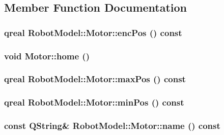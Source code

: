 \subsection{Member Function Documentation}
\hypertarget{class_robot_model_1_1_motor_a8f95b65d6bf72038a4aca3a394609354}{
\subsubsection[{encPos}]{\setlength{\rightskip}{0pt plus 5cm}qreal RobotModel::Motor::encPos () const}}
\label{class_robot_model_1_1_motor_a8f95b65d6bf72038a4aca3a394609354}
\hypertarget{class_robot_model_1_1_motor_ae8e0845a9284fbf8013137bf6b1f9293}{
\subsubsection[{home}]{\setlength{\rightskip}{0pt plus 5cm}void Motor::home ()}}
\label{class_robot_model_1_1_motor_ae8e0845a9284fbf8013137bf6b1f9293}
\hypertarget{class_robot_model_1_1_motor_abd6baf3a9ae74dcf970663e5ee303131}{
\subsubsection[{maxPos}]{\setlength{\rightskip}{0pt plus 5cm}qreal RobotModel::Motor::maxPos () const}}
\label{class_robot_model_1_1_motor_abd6baf3a9ae74dcf970663e5ee303131}
\hypertarget{class_robot_model_1_1_motor_af2cc406d7443e2cf350408d12b8e544b}{
\subsubsection[{minPos}]{\setlength{\rightskip}{0pt plus 5cm}qreal RobotModel::Motor::minPos () const}}
\label{class_robot_model_1_1_motor_af2cc406d7443e2cf350408d12b8e544b}
\hypertarget{class_robot_model_1_1_motor_a35eeb7f97a9339ee23c0689af2463c17}{
\subsubsection[{name}]{\setlength{\rightskip}{0pt plus 5cm}const QString\& RobotModel::Motor::name () const}}
